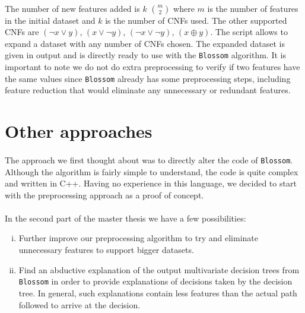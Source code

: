\documentclass[12pt]{report}
\theoremstyle{definition}
\theoremstyle{definition}
\theoremstyle{definition}
\begin{document}
\paragraph{} The number of new features added is $k$ $m \choose 2$ where $m$ is the number of features in
the initial dataset and $k$ is the number of CNFs used. The other supported CNFs are $(\neg x \lor y)$,
$(x \lor \neg y)$, $(\neg x \lor \neg y)$, $(x \oplus y)$. The script allows to expand a dataset with any number
of CNFs chosen. The expanded dataset is given in output and is directly ready to use with the \texttt{Blossom} algorithm.
It is important to note we do not do extra preprocessing to verify if two features have the same values since
\texttt{Blossom} already has some preprocessing steps, including feature reduction that would eliminate any unnecessary or
redundant features.


\section{Other approaches}
\paragraph{} The approach we first thought about was to directly alter the code of \texttt{Blossom}. Although the
algorithm is fairly simple to understand, the code is quite complex and written in C++. Having no experience in
this language, we decided to start with the preprocessing approach as a proof of concept.

\paragraph{} In the second part of the master thesis we have a few possibilities:

\begin{enumerate}[(i)]
    \item Further improve our preprocessing algorithm to try and eliminate unnecessary features to support bigger
    datasets.
    \item Find an abductive explanation \cite{multivariate-explaining} of the output multivariate decision trees
    from \texttt{Blossom} in order to provide explanations of decisions taken by the decision tree. In general,
    such explanations contain less features than the actual path followed to arrive at the decision.
\end{enumerate}
\end{document}

